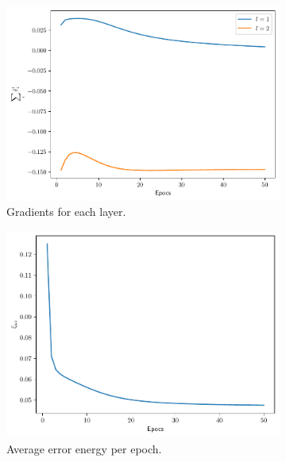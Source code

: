\documentclass[conference]{IEEEtran}
\theoremstyle{definition}
\theoremstyle{remark}
\theoremstyle{remark}
\begin{document}
\begin{figure}
  \centering
  \begin{subfigure}[b]{0.3\textwidth}
    \centering \includegraphics[width=\textwidth]{figs/2-0.2-emb-gradients.pdf}
    \caption{Gradients for each layer.}
  \end{subfigure}
  \begin{subfigure}[b]{0.3\textwidth}
    \centering \includegraphics[width=\textwidth]{figs/2-0.2-emb-error.pdf}
    \caption{Average error energy per epoch.}
  \end{subfigure}
  \begin{subfigure}[b]{0.3\textwidth}

\end{subfigure}
\end{figure}
\end{document}
